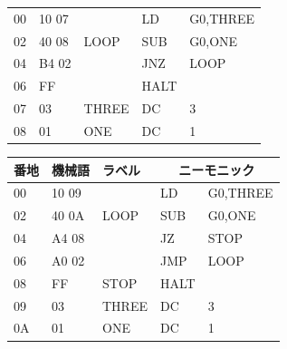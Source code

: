 \documentclass[handout]{beamer}        %
\begin{document}
\begin{frame}
\begin{minipage}{0.59\columnwidth}
{\begin{center}
\begin{tabular}{|l|l|l|l l|}
        \hline
        00 & 10 07 &           & LD   & G0,THREE              \\
        02 & 40 08 &  LOOP     & SUB  & G0,ONE                \\
        04 & B4 02 &           & JNZ  & LOOP                  \\
        06 & FF    &           & HALT &                       \\
        07 & 03    &  THREE    & DC   & 3                     \\
        08 & 01    &  ONE      & DC   & 1                     \\
        \hline
      \end{tabular}
    \end{center}}
    \vspace{0.5cm}
    {\ttfamily\footnotesize\begin{center}
      \begin{tabular}{|l|l|l|l l|} \hline
        番地 & 機械語 & ラベル & \multicolumn{2}{|c|}{ニーモニック} \\
        \hline
        00 & 10 09 &           & LD   & G0,THREE              \\
        02 & 40 0A &  LOOP     & SUB  & G0,ONE                \\
        04 & A4 08 &           & JZ   & STOP                  \\
        06 & A0 02 &           & JMP  & LOOP                  \\
        08 & FF    &  STOP     & HALT &                       \\
        09 & 03    &  THREE    & DC   & 3                     \\
        0A & 01    &  ONE      & DC   & 1                     \\
        \hline
      \end{tabular}
    \end{center}}
  \end{minipage}
  \vfill
\end{frame}
\end{document}
